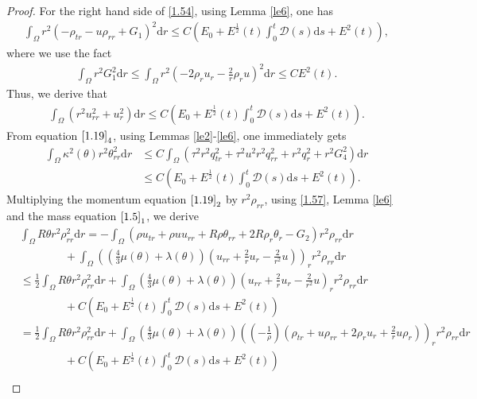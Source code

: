 \documentclass[11pt,reqno]{amsart}
\numberwithin{equation}{section}
\newcommand{\dif}{\mathrm{d}}
\begin{document}
\begin{proof}
For the right hand side of \eqref{1.54}, using Lemma \ref{le6}, one has
\begin{align*}
\int_{\Omega} r^2 \left(-\rho_{tr}-u \rho_{rr}+G_1\right)^2 \dif r  \le C(E_0+E^\frac{1}{2}(t) \int_0^t  \mathcal D(s)\dif s+E^2(t)),
\end{align*}
where we use the fact
\begin{align*}
\int_{\Omega} r^2 G_1^2 \dif r \le \int_{\Omega} r^2 (-2 \rho_r u_r-\frac{2}{r} \rho_r u)^2 \dif r \le CE^2(t).
\end{align*}
Thus, we derive that
\begin{align}\label{1.56}
\int_{\Omega} (r^2u_{rr}^2+u_r^2)\dif r \le C(E_0+E^\frac{1}{2}(t) \int_0^t  \mathcal D(s)\dif s+E^2(t)).
\end{align}
From equation $\eqref{1.19}_4$, using Lemmas \ref{le2}-\ref{le6}, one immediately gets
\begin{align}\label{1.57}
\int_{\Omega} \kappa^2(\theta) r^2 \theta_{rr}^2 \dif r &\le C \int_{\Omega} \left( \tau^2 r^2 q_{tr}^2+\tau^2 u^2 r^2 q_{rr}^2+r^2 q_r^2+r^2 G_4^2\right)\dif r \nonumber\\
 &\le C(E_0+E^\frac{1}{2}(t) \int_0^t  \mathcal D(s)\dif s+E^2(t)).
\end{align}
Multiplying the momentum equation $\eqref{1.19}_2$ by $r^2 \rho_{rr}$,  using \eqref{1.57}, Lemma \ref{le6} and the mass equation $\eqref{1.5}_1$, we derive{\small
\begin{align*}
&\int_{\Omega} R \theta r^2 \rho_{rr}^2 \dif r =-\int_{\Omega}  \left( \rho u_{tr} +\rho u u_{rr}+R \rho \theta_{rr}+2R\rho_r\theta_r-G_2\right)r^2 \rho_{rr} \dif r \\
&\qquad\qquad+\int_{\Omega} \left((\frac{4}{3} \mu(\theta)+\lambda(\theta))\left(u_{rr}+\frac{2}{r} u_r-\frac{2}{r^2} u\right)\right)_r r^2 \rho_{rr}\dif r\\
&\le \frac{1}{2}\int_{\Omega}  R\theta r^2 \rho_{rr}^2 \dif r + \int_{\Omega} \left(\frac{4}{3}\mu(\theta)+\lambda(\theta)\right)\left(u_{rr}+\frac{2}{r}u_r-\frac{2}{r^2} u\right)_r r^2 \rho_{rr} \dif r
 \\&\qquad\qquad+C(E_0+E^\frac{1}{2}(t) \int_0^t  \mathcal D(s)\dif s+E^2(t))\\
&= \frac{1}{2}\int_{\Omega}  R\theta r^2 \rho_{rr}^2 \dif r + \int_{\Omega} \left(\frac{4}{3}\mu(\theta)+\lambda(\theta)\right)\left(\left(-\frac{1}{\rho}\right) \left( \rho_{tr}+u\rho_{rr}
+2 \rho_r u_r+\frac{2}{r} u\rho_r\right)\right)_r r^2 \rho_{rr} \dif r \\
&\qquad\qquad+C(E_0+E^\frac{1}{2}(t) \int_0^t  \mathcal D(s)\dif s+E^2(t))\\

\end{align*}}
\end{proof}
\end{document}
